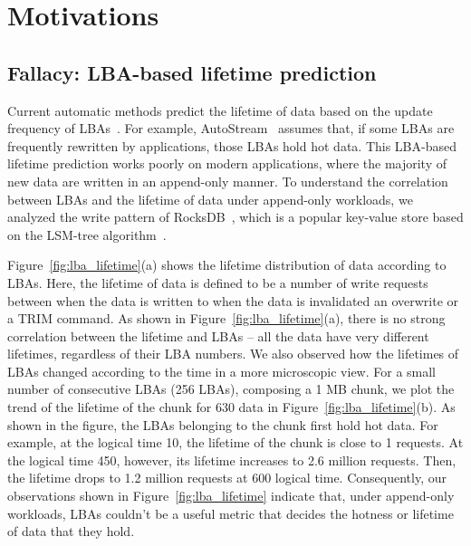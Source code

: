 \section{Motivations}
\subsection{Fallacy: LBA-based lifetime prediction}

Current automatic methods predict the lifetime of data based on the update
frequency of LBAs~\cite{AutoStream}.  
For example, AutoStream~\cite{AutoStream} assumes that, if
some LBAs are frequently rewritten by applications, those LBAs hold hot data.
This LBA-based lifetime prediction works poorly on modern applications, where
the majority of new data are written in an append-only manner.  To understand
the correlation between LBAs and the lifetime of data under append-only
workloads, we analyzed the write pattern of RocksDB~\cite{RocksDB}, which is a
popular key-value store based on the LSM-tree algorithm~\cite{LSM}.

Figure~\ref{fig:lba_lifetime}(a) shows the lifetime distribution of data
according to LBAs. Here, the lifetime of data is defined to be 
a number of write requests between when the data is written 
to when the data is invalidated an overwrite or a TRIM command. 
As shown in
Figure~\ref{fig:lba_lifetime}(a), there is no strong correlation between the
lifetime and LBAs -- all the data have very different lifetimes, regardless of
their LBA numbers. We also observed how the lifetimes of LBAs changed according
to the time in a more microscopic view.  For a small number of consecutive LBAs
(256 LBAs), composing a 1 MB chunk, 
we plot the trend of the lifetime of the chunk for 630 data
in Figure~\ref{fig:lba_lifetime}(b). As shown in the figure, the LBAs belonging
to the chunk first hold hot data. For example, at the logical time
10, the lifetime of the chunk is close to 1 requests.  
At the logical time 450, however, its lifetime increases to
2.6 million requests. Then, the lifetime drops to 1.2 million
requests at 600 logical time.  Consequently, our observations shown in
Figure~\ref{fig:lba_lifetime} indicate that, under append-only
workloads, LBAs couldn't be a useful metric that decides the hotness or
lifetime of data that they hold.

